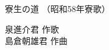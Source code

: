 \documentclass[10pt,b5j]{tarticle} %
\begin{document}
\begin{minipage}[c]{0.7\hsize} %
    \begin{center}
        {\LARGE
            寮生の道 %
        }
        {\small 
            （昭和58年寮歌） %
        }
    \end{center}
\end{minipage}
\begin{minipage}[c]{0.3\hsize} %
    \begin{flushright} %
        泉進介君 作歌\\島倉朝雄君 作曲 %
    \end{flushright}
\end{minipage}
\end{document}
